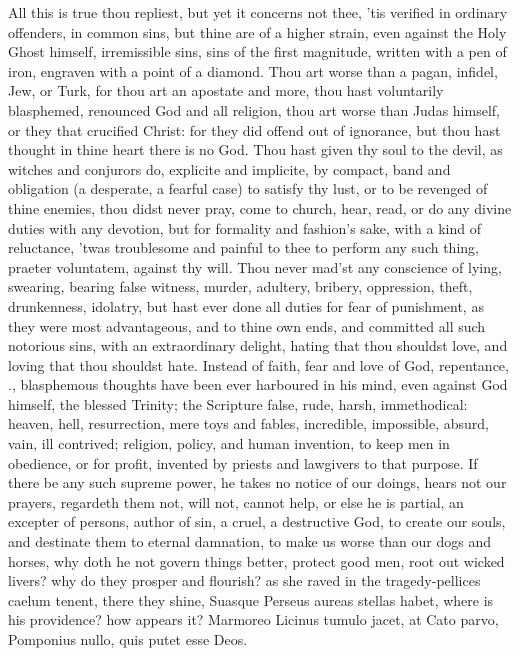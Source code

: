 {All this is true thou repliest, but yet it concerns not thee, 'tis
verified in ordinary offenders, in common sins, but thine are of a
higher strain, even against the Holy Ghost himself, irremissible sins,
sins of the first magnitude, written with a pen of iron, engraven with
a point of a diamond. Thou art worse than a pagan, infidel, Jew, or
Turk, for thou art an apostate and more, thou hast voluntarily
blasphemed, renounced God and all religion, thou art worse than Judas
himself, or they that crucified Christ: for they did offend out of
ignorance, but thou hast thought in thine heart there is no God. Thou
hast given thy soul to the devil, as witches and conjurors do,
explicite and implicite, by compact, band and obligation (a desperate,
a fearful case) to satisfy thy lust, or to be revenged of thine
enemies, thou didst never pray, come to church, hear, read, or do any
divine duties with any devotion, but for formality and fashion's sake,
with a kind of reluctance, 'twas troublesome and painful to thee to
perform any such thing, praeter voluntatem, against thy will. Thou
never mad'st any conscience of lying, swearing, bearing false witness,
murder, adultery, bribery, oppression, theft, drunkenness, idolatry,
but hast ever done all duties for fear of punishment, as they were most
advantageous, and to thine own ends, and committed all such notorious
sins, with an extraordinary delight, hating that thou shouldst love,
and loving that thou shouldst hate. Instead of faith, fear and love of
God, repentance, \etc{}., blasphemous thoughts have been ever harboured in
his mind, even against God himself, the blessed Trinity; the
Scripture false, rude, harsh, immethodical: heaven, hell,
resurrection, mere toys and fables, incredible, impossible,
absurd, vain, ill contrived; religion, policy, and human invention, to
keep men in obedience, or for profit, invented by priests and lawgivers
to that purpose. If there be any such supreme power, he takes no notice
of our doings, hears not our prayers, regardeth them not, will not,
cannot help, or else he is partial, an excepter of persons, author of
sin, a cruel, a destructive God, to create our souls, and destinate
them to eternal damnation, to make us worse than our dogs and horses,
why doth he not govern things better, protect good men, root out wicked
livers? why do they prosper and flourish? as she raved in the
tragedy-pellices caelum tenent, there they shine, Suasque Perseus
aureas stellas habet, where is his providence? how appears it?
Marmoreo Licinus tumulo jacet, at Cato parvo,
Pomponius nullo, quis putet esse Deos.

}
